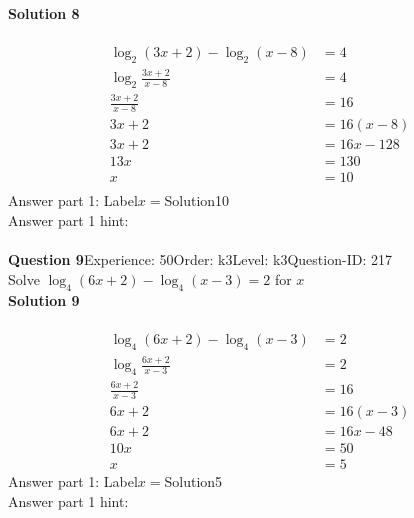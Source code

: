 \documentclass{article}
\begin{document}
\noindent\textbf{Solution 8}\\[2pt]
\\[-35pt]\begin{align*}
\log_{2}(3x+2)-\log_{2}(x-8)&=4\\[2pt]
\log_{2}\displaystyle\frac{3x+2}{x-8}&=4\\[2pt]
\displaystyle\frac{3x+2}{x-8}&=16\\[2pt]
3x+2&=16(x-8)\\[2pt]
3x+2&=16x-128\\[2pt]
13x&=130\\[2pt]
x&=10\\[-50pt]
\end{align*}
Answer part 1: \hspace{10pt}Label\hspace{10pt}$x=$\hspace{10pt}Solution\hspace{10pt}10\\
Answer part 1 hint: \hspace{15pt}\\
\\[4pt]
\noindent\textbf{Question 9}\hspace{20pt}Experience: 50\hspace{20pt}Order: k3\hspace{20pt}Level: k3\hspace{20pt}Question-ID: 217\\[2pt]
Solve $\log_{4}(6x+2)-\log_{4}(x-3)=2$ for $x$\\[4pt]
\noindent\textbf{Solution 9}\\[2pt]
\\[-35pt]\begin{align*}
\log_{4}(6x+2)-\log_{4}(x-3)&=2\\[2pt]
\log_{4}\displaystyle\frac{6x+2}{x-3}&=2\\[2pt]
\displaystyle\frac{6x+2}{x-3}&=16\\[2pt]
6x+2&=16(x-3)\\[2pt]
6x+2&=16x-48\\[2pt]
10x&=50\\[2pt]
x&=5
\end{align*}
Answer part 1: \hspace{10pt}Label\hspace{10pt}$x=$\hspace{10pt}Solution\hspace{10pt}5\\
Answer part 1 hint: \hspace{15pt}\\
\end{document}
